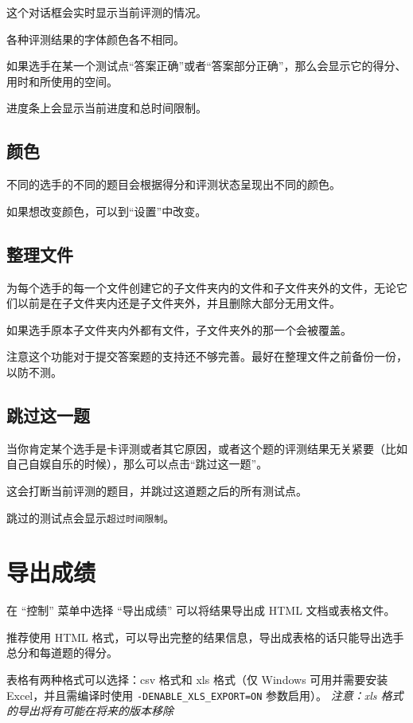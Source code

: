 \documentclass[UTF-8]{ctexart}
\begin{document}
			这个对话框会实时显示当前评测的情况。

			各种评测结果的字体颜色各不相同。

			如果选手在某一个测试点“答案正确”或者“答案部分正确”，那么会显示它的得分、用时和所使用的空间。

			进度条上会显示当前进度和总时间限制。

		\subsection{颜色}

			不同的选手的不同的题目会根据得分和评测状态呈现出不同的颜色。

			如果想改变颜色，可以到“设置”中改变。

		\subsection{整理文件}

			为每个选手的每一个文件创建它的子文件夹内的文件和子文件夹外的文件，无论它们以前是在子文件夹内还是子文件夹外，并且删除大部分无用文件。

			如果选手原本子文件夹内外都有文件，子文件夹外的那一个会被覆盖。

			注意这个功能对于提交答案题的支持还不够完善。最好在整理文件之前备份一份，以防不测。

		\subsection{跳过这一题}

			当你肯定某个选手是卡评测或者其它原因，或者这个题的评测结果无关紧要（比如自己自娱自乐的时候），那么可以点击“跳过这一题”。

			这会打断当前评测的题目，并跳过这道题之后的所有测试点。

			跳过的测试点会显示\texttt{超过时间限制}。

	\newpage

	\section{导出成绩}

		在 “控制” 菜单中选择 “导出成绩” 可以将结果导出成 HTML 文档或表格文件。

		推荐使用 HTML 格式，可以导出完整的结果信息，导出成表格的话只能导出选手总分和每道题的得分。

		表格有两种格式可以选择：csv 格式和 xls 格式（仅 Windows 可用并需要安装 Excel，并且需编译时使用 \verb|-DENABLE_XLS_EXPORT=ON| 参数启用）。 \emph{注意：xls 格式的导出将有可能在将来的版本移除}
\end{document}
